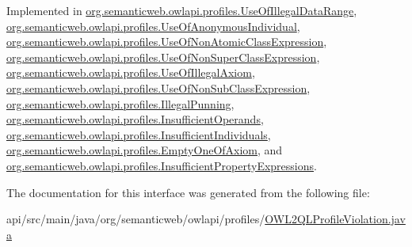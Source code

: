 Implemented in \hyperlink{classorg_1_1semanticweb_1_1owlapi_1_1profiles_1_1_use_of_illegal_data_range_af4b6454c3f28c3b76d76ea0baacea1c1}{org.\-semanticweb.\-owlapi.\-profiles.\-Use\-Of\-Illegal\-Data\-Range}, \hyperlink{classorg_1_1semanticweb_1_1owlapi_1_1profiles_1_1_use_of_anonymous_individual_aa101ff69a3f83afe794b756ca66c719d}{org.\-semanticweb.\-owlapi.\-profiles.\-Use\-Of\-Anonymous\-Individual}, \hyperlink{classorg_1_1semanticweb_1_1owlapi_1_1profiles_1_1_use_of_non_atomic_class_expression_ae8c291f8ed1df16468184c6da9f66102}{org.\-semanticweb.\-owlapi.\-profiles.\-Use\-Of\-Non\-Atomic\-Class\-Expression}, \hyperlink{classorg_1_1semanticweb_1_1owlapi_1_1profiles_1_1_use_of_non_super_class_expression_aded020faab763d40cf94ff4c78ea24fa}{org.\-semanticweb.\-owlapi.\-profiles.\-Use\-Of\-Non\-Super\-Class\-Expression}, \hyperlink{classorg_1_1semanticweb_1_1owlapi_1_1profiles_1_1_use_of_illegal_axiom_a1eefc81364b3f308639aa00b992b8025}{org.\-semanticweb.\-owlapi.\-profiles.\-Use\-Of\-Illegal\-Axiom}, \hyperlink{classorg_1_1semanticweb_1_1owlapi_1_1profiles_1_1_use_of_non_sub_class_expression_a9051a12d41db68d4b911ec3e074b9022}{org.\-semanticweb.\-owlapi.\-profiles.\-Use\-Of\-Non\-Sub\-Class\-Expression}, \hyperlink{classorg_1_1semanticweb_1_1owlapi_1_1profiles_1_1_illegal_punning_a852f8cf10e6d094a343d3fd784e24ae1}{org.\-semanticweb.\-owlapi.\-profiles.\-Illegal\-Punning}, \hyperlink{classorg_1_1semanticweb_1_1owlapi_1_1profiles_1_1_insufficient_operands_a35410025411f505448acbe925e7fba64}{org.\-semanticweb.\-owlapi.\-profiles.\-Insufficient\-Operands}, \hyperlink{classorg_1_1semanticweb_1_1owlapi_1_1profiles_1_1_insufficient_individuals_a60f062dfe613d41bb0f1dda0f3cd33ca}{org.\-semanticweb.\-owlapi.\-profiles.\-Insufficient\-Individuals}, \hyperlink{classorg_1_1semanticweb_1_1owlapi_1_1profiles_1_1_empty_one_of_axiom_a7111591813fdd75d45836004d049eb3e}{org.\-semanticweb.\-owlapi.\-profiles.\-Empty\-One\-Of\-Axiom}, and \hyperlink{classorg_1_1semanticweb_1_1owlapi_1_1profiles_1_1_insufficient_property_expressions_a9a836675ca7fdc83eb1ed7379684a001}{org.\-semanticweb.\-owlapi.\-profiles.\-Insufficient\-Property\-Expressions}.



The documentation for this interface was generated from the following file\-:\begin{DoxyCompactItemize}
\item 
api/src/main/java/org/semanticweb/owlapi/profiles/\hyperlink{_o_w_l2_q_l_profile_violation_8java}{O\-W\-L2\-Q\-L\-Profile\-Violation.\-java}\end{DoxyCompactItemize}

